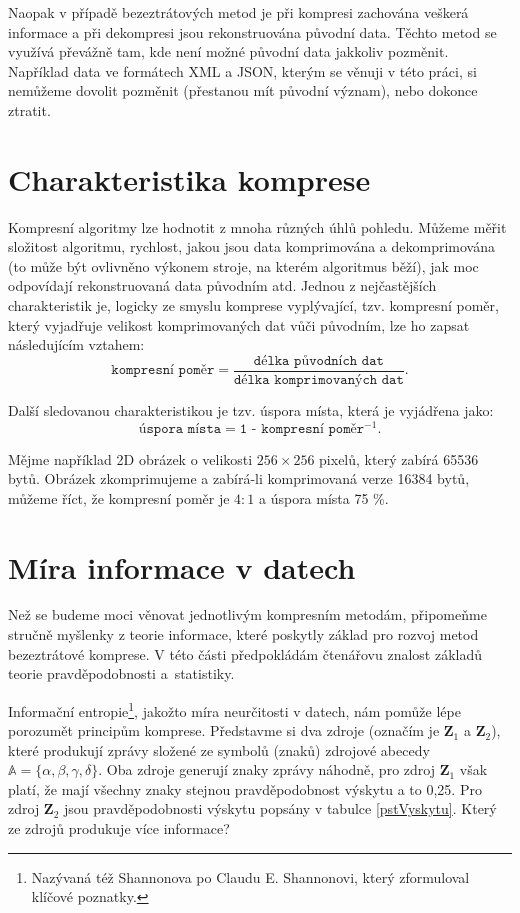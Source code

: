 Naopak v případě bezeztrátových metod je při kompresi zachována veškerá informace a při dekompresi
jsou rekonstruována původní data. Těchto metod se využívá převážně tam, kde není možné původní data jakkoliv pozměnit. Například data ve formátech XML a JSON, kterým se věnuji v této práci, si nemůžeme dovolit pozměnit (přestanou mít původní význam), nebo dokonce ztratit.

\section{Charakteristika komprese}
Kompresní algoritmy lze hodnotit z mnoha různých úhlů pohledu. Můžeme měřit složitost algoritmu, rychlost, jakou jsou data komprimována a dekomprimována (to může být ovlivněno výkonem stroje, na kterém algoritmus běží), jak moc odpovídají rekonstruovaná data původním atd.
Jednou z nejčastějších charakteristik je, logicky ze smyslu komprese vy\-plý\-va\-jí\-cí, tzv. kompresní poměr, který vyjadřuje velikost komprimovaných dat vůči původním, lze ho zapsat následujícím  vztahem:
\begin{equation}
\texttt{kompresní poměr} = \frac{\texttt{délka původních dat}}{\texttt{délka komprimovaných dat}}.
\end{equation}

Další sledovanou charakteristikou je tzv. úspora místa, která je vyjádřena jako:
\begin{equation}
\texttt{úspora místa} = \texttt{1 - kompresní poměr$^{-1}$}.
\end{equation}

Mějme například 2D obrázek o velikosti $256\times256$ pixelů, který zabírá 65536 bytů. Obrázek zkomprimujeme a zabírá-li komprimovaná verze 16384 bytů, můžeme říct, že kompresní poměr je $4:1$ a úspora místa 75 \%. 

\section{Míra informace v datech}
Než se budeme moci věnovat jednotlivým kompresním metodám, připomeňme stručně myšlenky z teorie informace, které poskytly základ pro rozvoj metod bezeztrátové komprese. V této části předpokládám čtenářovu znalost základů teorie pravděpodobnosti a~statistiky.

Informační entropie\footnote{Nazývaná též Shannonova po Claudu E. Shannonovi, který zformuloval klíčové poznatky.}, jakožto míra neurčitosti v datech, nám pomůže lépe porozumět principům komprese. Představme si dva zdroje (označím je $\mathbf{Z}_1$ a $\mathbf{Z}_2$), které produkují zprávy složené ze symbolů (znaků) zdrojové abecedy $\mathbb{A} = \{\alpha, \beta, \gamma, \delta\}$. Oba zdroje generují znaky zprávy náhodně, pro zdroj $\mathbf{Z}_1$ však platí, že mají všechny znaky stejnou pravděpodobnost výskytu a to 0,25. Pro zdroj $\mathbf{Z}_2$ jsou pravděpodobnosti výskytu popsány v tabulce \ref{pstVyskytu}. Který ze zdrojů produkuje více informace?

